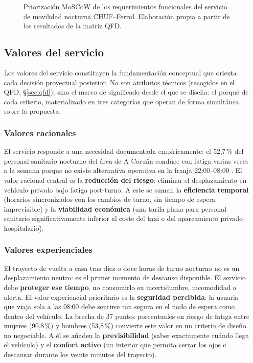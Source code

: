 \begin{figure}[htbp]
	\centering
	\fbox{\rule{0pt}{5cm}\rule{0.95\textwidth}{0pt}}
	\caption{Priorización MoSCoW de los requerimientos funcionales
		del servicio de movilidad nocturna CHUF--Ferrol. Elaboración
		propia a partir de los resultados de la matriz QFD.}
	\label{fig:moscow}
\end{figure}

\subsection{Valores del servicio}\label{sec:valores}

Los valores del servicio constituyen la fundamentación conceptual
que orienta cada decisión proyectual posterior. No son atributos
técnicos (recogidos en el QFD, §\ref{sec:qfd}), sino el marco
de significado desde el que se diseña: el porqué de cada criterio,
materializado en tres categorías que operan de forma simultánea
sobre la propuesta.

\subsubsection{Valores racionales}
\label{sec:valores-racionales}

El servicio responde a una necesidad documentada empíricamente: el
52,7\,\% del personal sanitario nocturno del área de A Coruña
conduce con fatiga varias veces a la semana porque no existe
alternativa operativa en la franja 22:00--08:00
\parencite{LouridoRegueira2026}. El valor racional central es la
\textbf{reducción del riesgo}: eliminar el desplazamiento en
vehículo privado bajo fatiga post-turno. A este se suman la
\textbf{eficiencia temporal} (horarios sincronizados con los
cambios de turno, sin tiempo de espera imprevisible) y la
\textbf{viabilidad económica} (una tarifa plana para personal
sanitario significativamente inferior al coste del taxi o del
aparcamiento privado hospitalario).

\subsubsection{Valores experienciales}
\label{sec:valores-experienciales}

El trayecto de vuelta a casa tras diez o doce horas de turno
nocturno no es un desplazamiento neutro: es el primer momento
de descanso disponible. El servicio debe \textbf{proteger ese
tiempo}, no consumirlo en incertidumbre, incomodidad o alerta.
El valor experiencial prioritario es la \textbf{seguridad
percibida}: la usuaria que viaja sola a las 08:00 debe sentirse
tan segura en el nodo de espera como dentro del vehículo. La
brecha de 37 puntos porcentuales en riesgo de fatiga entre
mujeres (90,8\,\%) y hombres (53,8\,\%) \parencite{LouridoRegueira2026}
convierte este valor en un criterio de diseño no negociable.
A él se añaden la \textbf{previsibilidad} (saber exactamente
cuándo llega el vehículo) y el \textbf{confort activo} (un
interior que permita cerrar los ojos o descansar durante los
veinte minutos del trayecto).


